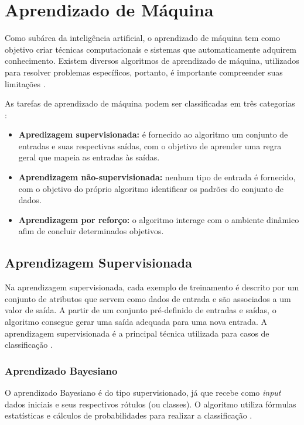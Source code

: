 \chapter{Aprendizado de Máquina}

Como subárea da inteligência artificial, o aprendizado de máquina tem como objetivo criar técnicas computacionais e sistemas que automaticamente adquirem conhecimento. Existem diversos algoritmos de aprendizado de máquina, utilizados para resolver problemas específicos, portanto, é importante compreender suas limitações \cite{rezende2003}.

As tarefas de aprendizado de máquina podem ser classificadas em três categorias \cite{russel2003}:

\begin{itemize}
    \item \textbf{Apredizagem supervisionada:} é fornecido ao algoritmo um conjunto de entradas e suas respectivas saídas, com o objetivo de aprender uma regra geral que mapeia as entradas às saídas.
    \item \textbf{Aprendizagem não-supervisionada:} nenhum tipo de entrada é fornecido, com o objetivo do próprio algoritmo identificar os padrões do conjunto de dados.
    \item \textbf{Aprendizagem por reforço:} o algoritmo interage com o ambiente dinâmico afim de concluir determinados objetivos.
\end{itemize}


\section{Aprendizagem Supervisionada}

Na aprendizagem supervisionada, cada exemplo de treinamento é descrito por um conjunto de atributos que servem como dados de entrada e são associados a um valor de saída. A partir de um conjunto pré-definido de entradas e saídas, o algoritmo consegue gerar uma saída adequada para uma nova entrada. A aprendizagem supervisionada é a principal técnica utilizada para casos de classificação \cite{mohri2012}.

\subsection{Aprendizado Bayesiano}

O aprendizado Bayesiano é do tipo supervisionado, já que recebe como \textit{input} dados iniciais e seus respectivos rótulos (ou classes). O algoritmo utiliza fórmulas estatísticas e cálculos de probabilidades para realizar a classificação \cite{mitchell1997}.

